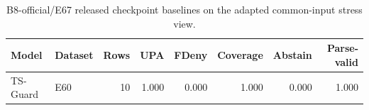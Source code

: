 \begin{table}[t]
\centering
\caption{B8-official/E67 released checkpoint baselines on the adapted common-input stress view.}
\label{tab:b8-official-checkpoints}
\begin{tabular}{llrrrrrr}
\toprule
Model & Dataset & Rows & UPA & FDeny & Coverage & Abstain & Parse-valid \\
\midrule
TS-Guard & E60 & 10 & 1.000 & 0.000 & 1.000 & 0.000 & 1.000 \\
\bottomrule
\end{tabular}
\end{table}
